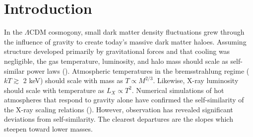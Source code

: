 \documentclass[iop]{emulateapj}
\begin{document}


\section{Introduction}\label{sec:1}
In the $\Lambda$CDM cosmogony, small dark matter density fluctuations grew through the influence of gravity to create today's  massive dark matter haloes. Assuming structure developed primarily by gravitational forces and that cooling was negligible, the gas temperature, luminosity, and halo mass should scale as self-similar power laws (\citealt{Kaiser:86}). Atmospheric temperatures in the bremsstrahlung regime ($kT \gtrsim$ 2 keV) should scale with mass as $T \propto M^{2/3}$.  Likewise, X-ray luminosity should scale with temperature as $L_X \propto T^2$. Numerical simulations of hot atmospheres that respond to gravity alone have confirmed the self-similarity of the X-ray scaling relations (\citealt{Evrard:96, Bryan:98, Thomas:01, Voit:02, Voitr:05}). However, observation has revealed significant deviations from self-similarity. The clearest departures are the slopes which steepen toward lower masses.

\end{document}
